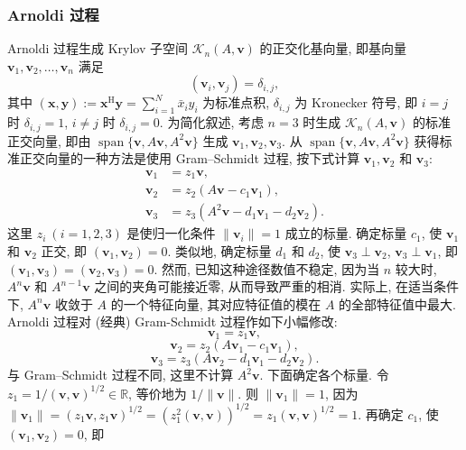 \subsubsection{{Arnoldi 过程}}\label{subsec:arnoldi-process}
{Arnoldi 过程生成 Krylov 子空间 $\mathcal K_n(A,\bm v)$ 的正交化基向量, 即基向量 $\bm v_1,\bm v_2,\ldots,\bm v_n$ 满足}
\[(\bm v_i,\bm v_j)=\delta_{i,j},\]
{其中 $(\bm x,\bm y):=\bm x^{\mathrm H}\bm y=\sum_{i=1}^N\bar x_i y_i$ 为标准点积, $\delta_{i,j}$ 为 Kronecker 符号, 即 $i=j$ 时 $\delta_{i,j}=1$, $i\ne j$ 时 $\delta_{i,j}=0$.}
{为简化叙述, 考虑 $n=3$ 时生成 $\mathcal K_n(A,\bm v)$ 的标准正交向量, 即由 $\operatorname{span}\{\bm v,A\bm v,A^2\bm v\}$ 生成 $\bm v_1,\bm v_2,\bm v_3$.}
{从 $\operatorname{span}\{\bm v,A\bm v,A^2\bm v\}$ 获得标准正交向量的一种方法是使用 Gram--Schmidt 过程, 按下式计算 $\bm v_1,\bm v_2$ 和 $\bm v_3$:}
\[
\begin{aligned}
\bm v_1&=z_1\bm v,\\
\bm v_2&=z_2(A\bm v-c_1\bm v_1),\\
\bm v_3&=z_3(A^2\bm v-d_1\bm v_1-d_2\bm v_2).
\end{aligned}
\]
{这里 $z_i\ (i=1,2,3)$ 是使归一化条件 $\|\bm v_i\|=1$ 成立的标量. 确定标量 $c_1$, 使 $\bm v_1$ 和 $\bm v_2$ 正交, 即 $(\bm v_1,\bm v_2)=0$. 类似地, 确定标量 $d_1$ 和 $d_2$, 使 $\bm v_3\perp\bm v_2$, $\bm v_3\perp\bm v_1$, 即 $(\bm v_1,\bm v_3)=(\bm v_2,\bm v_3)=0$. 然而, 已知这种途径数值不稳定, 因为当 $n$ 较大时, $A^n\bm v$ 和 $A^{n-1}\bm v$ 之间的夹角可能接近零, 从而导致严重的相消. 实际上, 在适当条件下, $A^n\bm v$ 收敛于 $A$ 的一个特征向量, 其对应特征值的模在 $A$ 的全部特征值中最大.}
{Arnoldi 过程对 (经典) Gram-Schmidt 过程作如下小幅修改:}
\begin{equation}\label{eq:arnoldi-first-vector}\bm v_1=z_1\bm v,\end{equation}
\begin{equation}\label{eq:arnoldi-second-vector}\bm v_2=z_2(A\bm v_1-c_1\bm v_1),\end{equation}
\begin{equation}\label{eq:arnoldi-third-vector}\bm v_3=z_3(A\bm v_2-d_1\bm v_1-d_2\bm v_2).\end{equation}
{与 Gram--Schmidt 过程不同, 这里不计算 $A^2\bm v$. 下面确定各个标量. 令 $z_1=1/(\bm v,\bm v)^{1/2}\in\mathbb R$, 等价地为 $1/\|\bm v\|$. 则 $\|\bm v_1\|=1$, 因为 $\|\bm v_1\|=(z_1\bm v,z_1\bm v)^{1/2}=(z_1^2(\bm v,\bm v))^{1/2}=z_1(\bm v,\bm v)^{1/2}=1$. 再确定 $c_1$, 使 $(\bm v_1,\bm v_2)=0$, 即}
